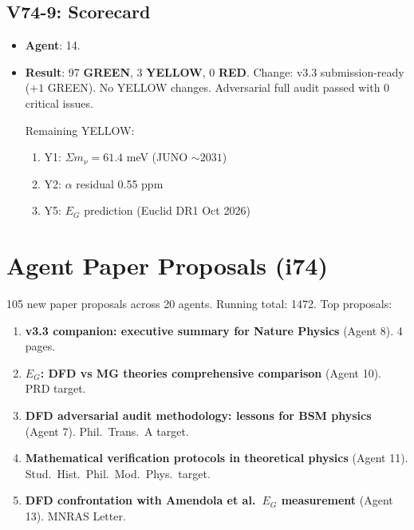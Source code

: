 \documentclass[11pt,a4paper]{article}
\newcommand{\GREEN}{\textcolor{dfdgreen}{\textbf{GREEN}}}
\newcommand{\YELLOW}{\textcolor{dfdyellow}{\textbf{YELLOW}}}
\newcommand{\RED}{\textcolor{dfdred}{\textbf{RED}}}
\begin{document}
\subsection{V74-9: Scorecard}
\begin{itemize}[nosep]
\item \textbf{Agent}: 14.
\item \textbf{Result}: 97 \GREEN, 3 \YELLOW, 0 \RED. Change: v3.3 submission-ready ($+1$ GREEN). No YELLOW changes. Adversarial full audit passed with 0 critical issues.

Remaining YELLOW:
\begin{enumerate}[nosep]
\item Y1: $\Sigma m_\nu = 61.4$ meV (JUNO $\sim 2031$)
\item Y2: $\alpha$ residual 0.55 ppm
\item Y5: $E_G$ prediction (Euclid DR1 Oct 2026)
\end{enumerate}
\end{itemize}

\section{Agent Paper Proposals (i74)}

105 new paper proposals across 20 agents. Running total: 1472. Top proposals:

\begin{enumerate}[nosep]
\item \textbf{v3.3 companion: executive summary for Nature Physics} (Agent 8). 4 pages.
\item \textbf{$E_G$: DFD vs MG theories comprehensive comparison} (Agent 10). PRD target.
\item \textbf{DFD adversarial audit methodology: lessons for BSM physics} (Agent 7). Phil.~Trans.~A target.
\item \textbf{Mathematical verification protocols in theoretical physics} (Agent 11). Stud.~Hist.~Phil.~Mod.~Phys.~target.
\item \textbf{DFD confrontation with Amendola et al.\ $E_G$ measurement} (Agent 13). MNRAS Letter.
\end{enumerate}
\end{document}
